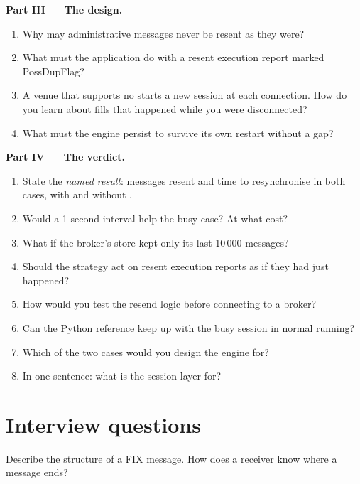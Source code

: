 \begin{problem}
\medskip\noindent\textbf{Part III --- The design.}
\begin{enumerate}[resume]
\item Why may administrative messages never be resent as they were?
\item What must the application do with a resent execution report marked PossDupFlag?
\item A venue that supports no  starts a new session at each connection. How do you learn about fills that
happened while you were disconnected?
\item What must the engine persist to survive its own restart without a gap?
\end{enumerate}

\medskip\noindent\textbf{Part IV --- The verdict.}
\begin{enumerate}[resume]
\item State the \emph{named result}: messages resent and time to resynchronise in both cases, with and without .
\item Would a 1-second  interval help the busy case? At what cost?
\item What if the broker's store kept only its last 10\,000 messages?
\item Should the strategy act on resent execution reports as if they had just happened?
\item How would you test the resend logic before connecting to a broker?
\item Can the Python reference keep up with the busy session in normal running?
\item Which of the two cases would you design the engine for?
\item In one sentence: what is the session layer for?
\end{enumerate}
\end{problem}

\section{Interview questions}

\begin{interviewq}\label{iq:ll:protocols-i-fix:1}
Describe the structure of a FIX message. How does a receiver know where a message ends?
\end{interviewq}

